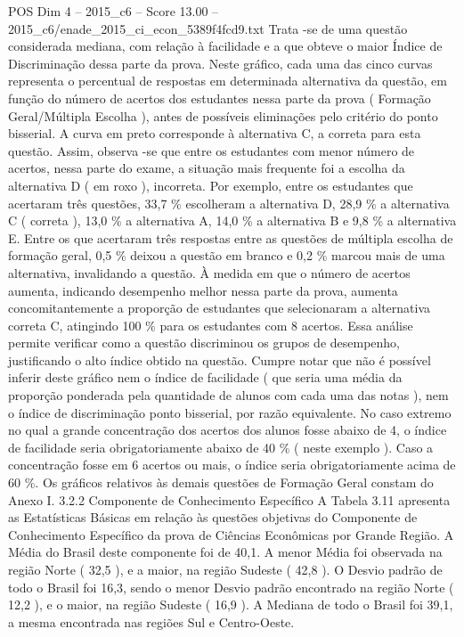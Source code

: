 \begin{textsample}{POS Dim 4 – 2015\_c6 – Score 13.00 – 2015\_c6/enade\_2015\_ci\_econ\_5389f4fcd9.txt}
Trata -se de uma questão considerada mediana, com relação à facilidade e a que obteve o maior Índice de Discriminação dessa parte da prova.
Neste gráfico, cada uma das cinco curvas representa o percentual de respostas em determinada alternativa da questão, em função do número de acertos dos estudantes nessa parte da prova ( Formação Geral/Múltipla Escolha ), antes de possíveis eliminações pelo critério do ponto bisserial.
A curva em preto corresponde à alternativa C, a correta para esta questão.
Assim, observa -se que entre os estudantes com menor número de acertos, nessa parte do exame, a situação mais frequente foi a escolha da alternativa D ( em roxo ), incorreta.
Por exemplo, entre os estudantes que acertaram três questões, 33,7 \% escolheram a alternativa D, 28,9 \% a alternativa C ( correta ), 13,0 \% a alternativa A, 14,0 \% a alternativa B e 9,8 \% a alternativa E.
Entre os que acertaram três respostas entre as questões de múltipla escolha de formação geral, 0,5 \% deixou a questão em branco e 0,2 \% marcou mais de uma alternativa, invalidando a questão.
À medida em que o número de acertos aumenta, indicando desempenho melhor nessa parte da prova, aumenta concomitantemente a proporção de estudantes que selecionaram a alternativa correta C, atingindo 100 \% para os estudantes com 8 acertos.
Essa análise permite verificar como a questão discriminou os grupos de desempenho, justificando o alto índice obtido na questão.
Cumpre notar que não é possível inferir deste gráfico nem o índice de facilidade ( que seria uma média da proporção ponderada pela quantidade de alunos com cada uma das notas ), nem o índice de discriminação ponto bisserial, por razão equivalente.
No caso extremo no qual a grande concentração dos acertos dos alunos fosse abaixo de 4, o índice de facilidade seria obrigatoriamente abaixo de 40 \% ( neste exemplo ).
Caso a concentração fosse em 6 acertos ou mais, o índice seria obrigatoriamente acima de 60 \%.
Os gráficos relativos às demais questões de Formação Geral constam do Anexo I. 3.2.2 Componente de Conhecimento Específico A Tabela 3.11 apresenta as Estatísticas Básicas em relação às questões objetivas do Componente de Conhecimento Específico da prova de Ciências Econômicas por Grande Região.
A Média do Brasil deste componente foi de 40,1.
A menor Média foi observada na região Norte ( 32,5 ), e a maior, na região Sudeste ( 42,8 ).
O Desvio padrão de todo o Brasil foi 16,3, sendo o menor Desvio padrão encontrado na região Norte ( 12,2 ), e o maior, na região Sudeste ( 16,9 ).
A Mediana de todo o Brasil foi 39,1, a mesma encontrada nas regiões Sul e Centro-Oeste.

\end{textsample}
